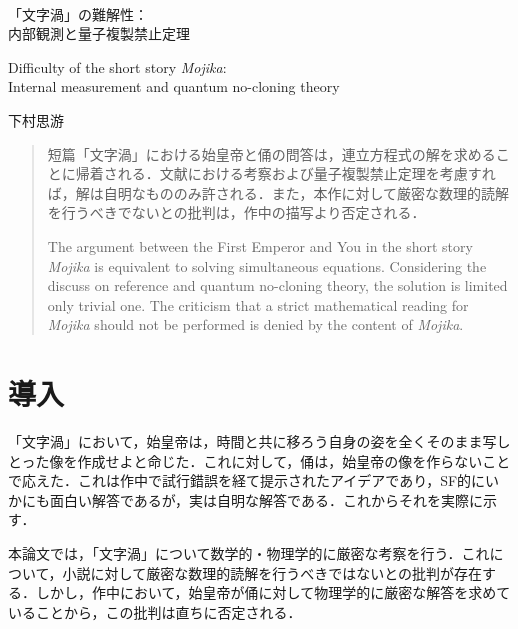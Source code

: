 \documentclass[10pt, a5paper, twoside]{jsarticle}
\theoremstyle{definition}
\begin{document}
	~ %

	\begin{center}

		\Large{「文字渦」の難解性： \\ 内部観測と量子複製禁止定理}

		\vspace{3mm}

		\large{Difficulty of the short story \textit{Mojika}: \\ Internal measurement and quantum no-cloning theory}

		\vspace{3mm}
		
		\large{下村思游}

	\end{center}

	\vspace{3mm}

	\begin{abstract}

		短篇「文字渦」における始皇帝と俑の問答は，連立方程式の解を求めることに帰着される．文献\cite{sshimo}における考察および量子複製禁止定理を考慮すれば，解は自明なもののみ許される．また，本作に対して厳密な数理的読解を行うべきでないとの批判は，作中の描写より否定される．

		\vspace{3mm}

		The argument between the First Emperor and You in the short story \textit{Mojika} is equivalent to solving simultaneous equations. Considering the discuss on reference \cite{sshimo} and quantum no-cloning theory, the solution is limited only trivial one. The criticism that a strict mathematical reading for \textit{Mojika} should not be performed is denied by the content of \textit{Mojika}.

	\end{abstract}

	\section{導入}

		「文字渦」において，始皇帝は，時間と共に移ろう自身の姿を全くそのまま写しとった像を作成せよと命じた．これに対して，俑は，始皇帝の像を作らないことで応えた．これは作中で試行錯誤を経て提示されたアイデアであり，SF的にいかにも面白い解答であるが，実は自明な解答である．これからそれを実際に示す．

		本論文では，「文字渦」について数学的・物理学的に厳密な考察を行う．これについて，小説に対して厳密な数理的読解を行うべきではないとの批判が存在する．しかし，作中において，始皇帝が俑に対して物理学的に厳密な解答を求めていることから，この批判は直ちに否定される．
\end{document}
